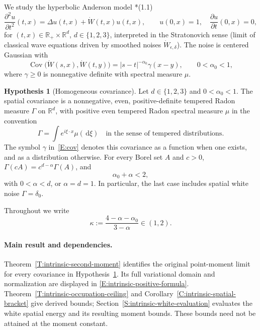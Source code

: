 \documentclass[12pt]{article}
\numberwithin{equation}{section}
\theoremstyle{definition}
\newtheorem{hypothesis}[theorem]{Hypothesis}
\newcommand{\R}{\mathbb{R}}
\newcommand{\W}{\dot W}
\newcommand{\ud}{\,\mathrm{d}}
\begin{document}
We study the hyperbolic Anderson model
\cite{chen:author2026:time-dependency}*{(1.1)}
\begin{equation}\label{E:HAM}
  \frac{\partial^2 u}{\partial t^2}(t,x)=\Delta u(t,x)+\W(t,x)u(t,x),
  \qquad u(0,x)=1,\quad \frac{\partial u}{\partial t}(0,x)=0,
\end{equation}
for $(t,x)\in\R_+\times\R^d$, $d\in\{1,2,3\}$, interpreted in the
Stratonovich sense (limit of classical wave equations driven by smoothed
noises $\W_{\epsilon,\delta}$). The noise is centered Gaussian with
\begin{equation}\label{E:cov}
  \operatorname{Cov}\big(\W(s,x),\W(t,y)\big)=|s-t|^{-\alpha_0}\gamma(x-y),
  \qquad 0<\alpha_0<1,
\end{equation}
where $\gamma\ge0$ is nonnegative definite with spectral measure $\mu$.

\begin{hypothesis}[Homogeneous covariance]\label{H:homog}
  Let $d\in\{1,2,3\}$ and $0<\alpha_0<1$.
  The spatial covariance is a nonnegative, even, positive-definite
  tempered Radon measure $\Gamma$ on $\R^d$, with positive even
  tempered Radon spectral measure $\mu$ in the convention
  \[
    \Gamma=\int e^{i\xi\cdot x}\mu(\ud\xi)
    \quad\text{in the sense of tempered distributions}.
  \]
  The symbol $\gamma$ in~\eqref{E:cov} denotes this covariance as a
  function when one exists, and as a distribution otherwise.
  For every Borel set $A$ and $c>0$,
  $\Gamma(cA)=c^{d-\alpha}\Gamma(A)$, and
  \begin{equation}\label{E:threshold}
    \alpha_0+\alpha<2,
  \end{equation}
  with $0<\alpha<d$, or $\alpha=d=1$.
  In particular, the last case includes spatial white noise
  $\Gamma=\delta_0$.
\end{hypothesis}

Throughout we write
\begin{equation}\label{E:kappa}
  \kappa:=\frac{4-\alpha-\alpha_0}{3-\alpha}\in(1,2).
\end{equation}

\paragraph{Main result and dependencies.}
Theorem~\ref{T:intrinsic-second-moment} identifies the original point-moment
limit for every covariance in Hypothesis~\ref{H:homog}.
Its full variational domain and normalization are displayed in
\eqref{E:intrinsic-positive-formula}.
Theorem~\ref{T:intrinsic-occupation-ceiling} and
Corollary~\ref{C:intrinsic-spatial-bracket} give derived bounds;
Section~\ref{S:intrinsic-white-evaluation} evaluates the white spatial
energy and its resulting moment bounds.
These bounds need not be attained at the moment constant.
\end{document}
